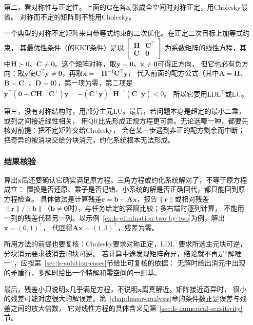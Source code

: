 第二，看对称性与正定性。上面的$\bm G$在各$\bm a_i$张成全空间时对称正定，用Cholesky最省。
对称而不定的矩阵则不能用Cholesky。

一个典型的对称不定矩阵来自带等式约束的二次优化。在正定二次目标上加等式约束，
其最优性条件（的KKT条件）是以
$\left[\begin{smallmatrix}\bm H&\bm C^\top\\\bm C&\bm0\end{smallmatrix}\right]$
为系数矩阵的线性方程，其中$\bm H\succ0$、$\bm C\neq\bm0$。这个矩阵对称，取$\bm y=\bm0$、$\bm x\neq\bm0$可得正方向，
但它也必有负方向：取$\bm y$使$\bm C^\top\bm y\neq\bm0$，再取$\bm x=-\bm H^{-1}\bm C^\top\bm y$，
代入前面的配方公式（其中$\bm A=\bm H$、$\bm B=\bm C^\top$、$\bm D=\bm0$），第一项为零，第二项是
$\bm y^\top(\bm0-\bm C\bm H^{-1}\bm C^\top)\bm y=-(\bm C^\top\bm y)^\top\bm H^{-1}(\bm C^\top\bm y)<0$。
所以它要用LDL$^{\top}$或LU。

第三，没有对称结构时，用部分主元LU。最后，若问题本身是超定的最小二乘，或列之间接近线性相关，
用QR比先形成正规方程更可靠。无论选哪一种，都要先核对前提：把不定矩阵交给Cholesky，
会在某一步遇到非正的配方剩余而中断；把奇异的被消块交给分块消元，约化系统根本无法形成。

\subsubsection{结果核验}
\label{sec:ls-linear-equation-verification}

算出$\bm x$后还要确认它确实满足原方程。三角方程或约化系统解对了，不等于原方程成立：
置换是否还原、乘子是否记错、小系统的解是否正确回代，都只能回到原方程检查。
具体做法是计算残差$\bm r=\bm b-\bm A\bm x$，报告$\lVert\bm r\rVert$或相对残差
$\lVert\bm r\rVert/\lVert\bm b\rVert$（$\bm b\neq\bm0$时），与任务给定的容限比较；多右端时逐列计算，
不能用一列的残差代替另一列。以示例~\ref{ex:ls-elimination-two-by-two}为例，解出$\bm x=(0,1)^\top$，
代回得$\bm A\bm x=(1,3)^\top$，残差为零。

所用方法的前提也要复核：Cholesky要求对称正定，LDL$^{\top}$要求所选主元块可逆，分块消元要求被消去的块可逆。
若计算中途发现矩阵奇异，结论就不再是“解唯一”，应按第~\ref{sec:ls-solution-cases}节给出可复核的依据：
无解时给出消元中出现的矛盾行，多解时给出一个特解和零空间的一组基。

最后，残差小只说明$\bm x$几乎满足方程，不说明$\bm x$离真解近。矩阵接近奇异时，
很小的残差可能对应很大的解误差。第~\ref{chap:linear-analysis}章的条件数正是误差与残差之间的放大倍数，
它对线性方程的具体含义见第~\ref{sec:ls-numerical-sensitivity}节。

